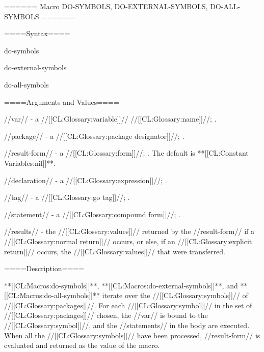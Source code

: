 ====== Macro DO-SYMBOLS, DO-EXTERNAL-SYMBOLS, DO-ALL-SYMBOLS ======

====Syntax====

\DefmacWithValuesNewline do-symbols {} {}

\DefmacWithValuesNewline do-external-symbols {} {}

\DefmacWithValuesNewline do-all-symbols {} {}

====Arguments and Values====

//var// - a //[[CL:Glossary:variable]]// //[[CL:Glossary:name]]//; \noeval.


//package// - a //[[CL:Glossary:package designator]]//; \eval.


//result-form// - a //[[CL:Glossary:form]]//; \evalspecial. The default is **[[CL:Constant Variables:nil]]**.

//declaration// - a  //[[CL:Glossary:expression]]//; \noeval.

//tag// - a //[[CL:Glossary:go tag]]//; \noeval.

//statement// - a //[[CL:Glossary:compound form]]//; \evalspecial.

//results// - the //[[CL:Glossary:values]]// returned by the //result-form// if a //[[CL:Glossary:normal return]]// occurs, or else, if an //[[CL:Glossary:explicit return]]// occurs, the //[[CL:Glossary:values]]// that were transferred.

====Description====

**[[CL:Macros:do-symbols]]**, **[[CL:Macros:do-external-symbols]]**, and **[[CL:Macros:do-all-symbols]]** iterate over the //[[CL:Glossary:symbols]]// of //[[CL:Glossary:packages]]//. For each //[[CL:Glossary:symbol]]// in the set of //[[CL:Glossary:packages]]// chosen, the //var// is bound to the //[[CL:Glossary:symbol]]//, and the //statements// in the body are executed. When all the //[[CL:Glossary:symbols]]// have been processed, //result-form// is evaluated and returned as the value of the macro.

